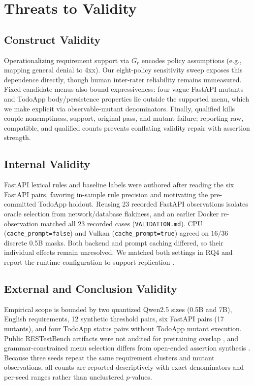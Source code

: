 \documentclass[sigconf,nonacm]{acmart}
\begin{document}
\section{Threats to Validity}
\subsection{Construct Validity}
Operationalizing requirement support via $G_r$ encodes policy assumptions (e.g., mapping general denial to 4xx). Our eight-policy sensitivity sweep exposes this dependence directly, though human inter-rater reliability remains unmeasured. Fixed candidate menus also bound expressiveness: four vague FastAPI mutants and TodoApp body/persistence properties lie outside the supported menu, which we make explicit via observable-mutant denominators. Finally, qualified kills couple nonemptiness, support, original pass, and mutant failure; reporting raw, compatible, and qualified counts prevents conflating validity repair with assertion strength.

\subsection{Internal Validity}
FastAPI lexical rules and baseline labels were authored after reading the six FastAPI pairs, favoring in-sample rule precision and motivating the pre-committed TodoApp holdout. Reusing 23 recorded FastAPI observations isolates oracle selection from network/database flakiness, and an earlier Docker re-observation matched all 23 recorded cases (\nolinkurl{VALIDATION.md}). CPU (\nolinkurl{cache_prompt=false}) and Vulkan (\nolinkurl{cache_prompt=true}) agreed on $16/36$ discrete 0.5B masks. Both backend and prompt caching differed, so their individual effects remain unresolved. We matched both settings in RQ4 and report the runtime configuration to support replication \cite{sallou2024}.

\subsection{External and Conclusion Validity}
Empirical scope is bounded by two quantized Qwen2.5 sizes (0.5B and 7B), English requirements, 12 synthetic threshold pairs, six FastAPI pairs (17 mutants), and four TodoApp status pairs without TodoApp mutant execution. Public RESTestBench artifacts were not audited for pretraining overlap \cite{molinelli2025,sallou2024}, and grammar-constrained menu selection differs from open-ended assertion synthesis \cite{ma2026,togbench2026}. Because three seeds repeat the same requirement clusters and mutant observations, all counts are reported descriptively with exact denominators and per-seed ranges rather than unclustered $p$-values.
\end{document}
